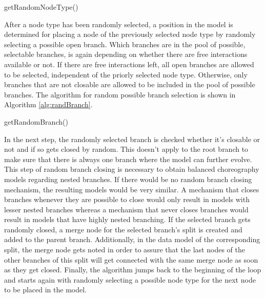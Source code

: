 \begin{algorithm}[H]
\small
\DontPrintSemicolon
\SetAlgoLined
{}
\caption{getRandomNodeType()}
\label{alg:randNodeType}
\end{algorithm}
\vspace{0.4cm}
After a node type has been randomly selected, a position in the model is determined for placing a node of the previously selected node type by randomly selecting a possible open branch. Which branches are in the pool of possible, selectable branches, is again depending on whether there are free interactions available or not. If there are free interactions left, all open branches are allowed to be selected, independent of the priorly selected node type. Otherwise, only branches that are not closable are allowed to be included in the pool of possible branches. The algorithm for random possible branch selection is shown in Algorithm \ref{alg:randBranch}.\\

\begin{algorithm}[H]
\small
\DontPrintSemicolon
\SetAlgoLined
{}
\caption{getRandomBranch()}
\label{alg:randBranch}
\end{algorithm}
\vspace{0.4cm}
In the next step, the randomly selected branch is checked whether it's closable or not and if so gets closed by random. This doesn't apply to the root branch to make sure that there is always one branch where the model can further evolve. This step of random branch closing is necessary to obtain balanced choreography models regarding nested branches. If there would be no random branch closing mechanism, the resulting models would be very similar. A mechanism that closes branches whenever they are possible to close would only result in models with lesser nested branches whereas a mechanism that never closes branches would result in models that have highly nested branching. If the selected branch gets randomly closed, a merge node for the selected branch's split is created and added to the parent branch. Additionally, in the data model of the corresponding split, the merge node gets noted in order to assure that the last nodes of the other branches of this split will get connected with the same merge node as soon as they get closed. Finally, the algorithm jumps back to the beginning of the loop and starts again with randomly selecting a possible node type for the next node to be placed in the model.\\

